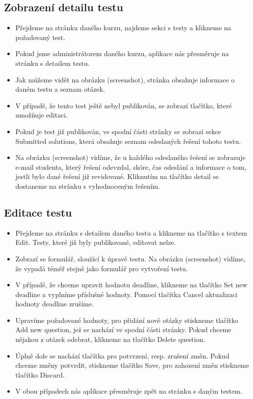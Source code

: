 \subsection{Zobrazení detailu testu}
\begin{itemize}
	\item Přejdeme na stránku daného kurzu, najdeme sekci s testy a klikneme na požadovaný test.
	\item Pokud jsme administrátorem daného kurzu, aplikace nás přesměruje na stránku s detailem testu.
	\item Jak můžeme vidět na obrázku (screenshot), stránka obsahuje informace o daném testu a seznam otázek.
	\item V případě, že tento test ještě nebyl publikován, se zobrazí tlačítko, které umožňuje editaci.
	\item Pokud je test již publikován, ve spodní části stránky se zobrazí sekce Submitted solutions, která obsahuje seznam odeslaných řešení tohoto testu.
	\item Na obrázku (screenshot) vidíme, že u každého odeslaného řešení se zobrazuje e-mail studenta, který řešení odevzdal, skóre, čas odeslání a informace o tom, jestli bylo dané řešení již revidované. Kliknutím na tlačítko detail se dostaneme na stránku s vyhodnoceným řešením.
\end{itemize}

\subsection{Editace testu}
\begin{itemize}
	\item Přejdeme na stránku s detailem daného testu a klikneme na tlačítko s textem Edit. Testy, které již byly publikované, editovat nelze.
	\item Zobrazí se formulář, sloužící k úpravě testu. Na obrázku (screenshot) vidíme, že vypadá téměř stejně jako formulář pro vytvoření testu.
	\item V případě, že chceme upravit hodnotu deadline, klikneme na tlačítko Set new deadline a vyplníme příslušné hodnoty. Pomocí tlačítka Cancel aktualizaci hodnoty deadline zrušíme.
	\item Upravíme požadované hodnoty, pro přidání nové otázky stiskneme tlačítko Add new question, jež se nachází ve spodní části stránky. Pokud chceme nějakou z otázek odebrat, klikneme na tlačítko Delete question.
	\item Úplně dole se nachází tlačítka pro potvrzení, resp. zrušení změn. Pokud chceme změny potvrdit, stiskneme tlačítko Save, pro zahození změn stiskneme tlačítko Discard.
	\item V obou případech nás aplikace přesměruje zpět na stránku s daným testem.
\end{itemize}

